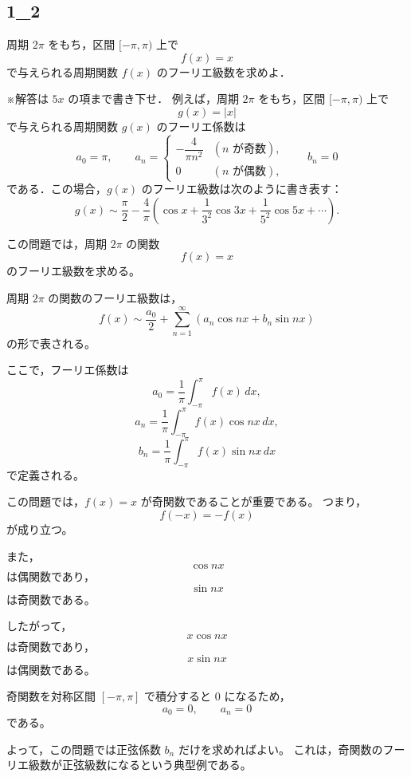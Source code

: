 \subsection{1_2}
\begin{exercise}
	周期 \(2\pi\) をもち，区間 \([-\pi,\pi)\) 上で
	\[
	f(x)=x
	\]
	で与えられる周期関数 \(f(x)\) のフーリエ級数を求めよ．
	
	\medskip
	
	※解答は \(5x\) の項まで書き下せ．
	例えば，周期 \(2\pi\) をもち，区間 \([-\pi,\pi)\) 上で
	\[
	g(x)=|x|
	\]
	で与えられる周期関数 \(g(x)\) のフーリエ係数は
	\[
	a_0=\pi,\qquad
	a_n=
	\begin{cases}
		-\dfrac{4}{\pi n^2} & (n \text{ が奇数}),\\[6pt]
		0 & (n \text{ が偶数}),
	\end{cases}
	\qquad
	b_n=0
	\]
	である．この場合，\(g(x)\) のフーリエ級数は次のように書き表す：
	\[
	g(x)\sim
	\frac{\pi}{2}
	-\frac{4}{\pi}
	\left(
	\cos x+\frac{1}{3^2}\cos 3x+\frac{1}{5^2}\cos 5x+\cdots
	\right).
	\]
\end{exercise}
\begin{background}
	この問題では，周期 \(2\pi\) の関数
	\[
	f(x)=x
	\]
	のフーリエ級数を求める。
	
	周期 \(2\pi\) の関数のフーリエ級数は，
	\[
	f(x)\sim \frac{a_0}{2}
	+\sum_{n=1}^{\infty}
	\left(a_n\cos nx+b_n\sin nx\right)
	\]
	の形で表される。
	
	ここで，フーリエ係数は
	\[
	a_0=\frac{1}{\pi}\int_{-\pi}^{\pi}f(x)\,dx,
	\]
	\[
	a_n=\frac{1}{\pi}\int_{-\pi}^{\pi}f(x)\cos nx\,dx,
	\]
	\[
	b_n=\frac{1}{\pi}\int_{-\pi}^{\pi}f(x)\sin nx\,dx
	\]
	で定義される。
	
	この問題では，\(f(x)=x\) が奇関数であることが重要である。
	つまり，
	\[
	f(-x)=-f(x)
	\]
	が成り立つ。
	
	また，
	\[
	\cos nx
	\]
	は偶関数であり，
	\[
	\sin nx
	\]
	は奇関数である。
	
	したがって，
	\[
	x\cos nx
	\]
	は奇関数であり，
	\[
	x\sin nx
	\]
	は偶関数である。
	
	奇関数を対称区間 \([-\pi,\pi]\) で積分すると \(0\) になるため，
	\[
	a_0=0,\qquad a_n=0
	\]
	である。
	
	よって，この問題では正弦係数 \(b_n\) だけを求めればよい。
	これは，奇関数のフーリエ級数が正弦級数になるという典型例である。
\end{background}
